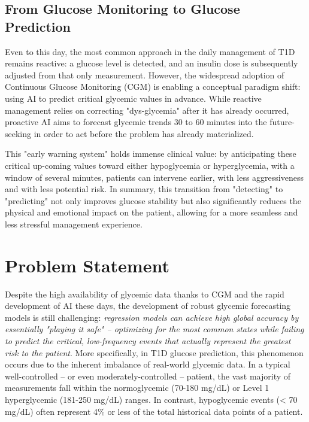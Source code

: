 \subsection{From Glucose Monitoring to Glucose Prediction}
\label{subsec:monitorging_evolution}

Even to this day, the most common approach in the daily management of T1D remains reactive: a glucose level is detected, and an insulin dose is subsequently adjusted from that only measurement. However, the widespread adoption of Continuous Glucose Monitoring (CGM) is enabling a conceptual paradigm shift: using AI to predict critical glycemic values in advance. While reactive management relies on correcting "dys-glycemia" after it has already occurred, proactive AI aims to forecast glycemic trends 30 to 60 minutes into the future-seeking in order to act before the problem has already materialized.

This "early warning system" holds immense clinical value: by anticipating these critical up-coming values toward either hypoglycemia or hyperglycemia, with a window of several minutes, patients can intervene earlier, with less aggressiveness and with less potential risk. In summary, this transition from "detecting" to "predicting" not only improves glucose stability but also significantly reduces the physical and emotional impact on the patient, allowing for a more seamless and less stressful management experience.

\section{Problem Statement}
\label{sec:problem_statement}

Despite the high availability of glycemic data thanks to CGM and the rapid development of AI these days, the development of robust glycemic forecasting models is still challenging: \textit{regression models can achieve high global accuracy by essentially "playing it safe" – optimizing for the most common states while failing to predict the critical, low-frequency events that actually represent the greatest risk to the patient}. More specifically, in T1D glucose prediction, this phenomenon occurs due to the inherent imbalance of real-world glycemic data. In a typical well-controlled -- or even moderately-controlled -- patient, the vast majority of measurements fall within the normoglycemic (70-180 mg/dL) or Level 1 hyperglycemic (181-250 mg/dL) ranges. In contrast, hypoglycemic events (< 70 mg/dL) often represent 4\% or less of the total historical data points of a patient.

